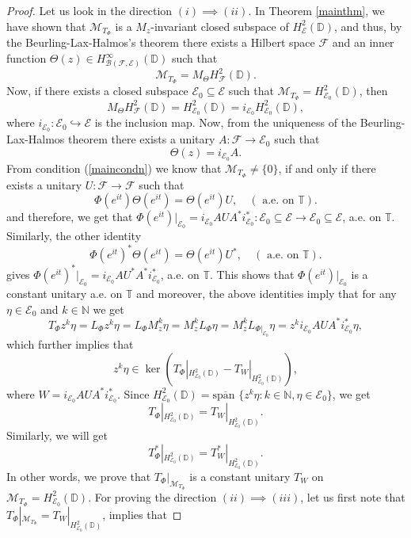 \documentclass[12pt]{amsart}
\numberwithin{equation}{section}
\theoremstyle{definition}
\newcommand{\Nat}{\mathbb{N}}
\newcommand{\D}{\mathbb{D}}
\newcommand{\T}{\mathbb{T}}
\newcommand{\1}{{\mbox{\bf 1}}}
\newcommand{\clb}{\mathcal{B}}
\newcommand{\cle}{\mathcal{E}}
\newcommand{\clf}{\mathcal{F}}
\newcommand{\clm}{\mathcal{M}}
\newcommand{\raro}{\rightarrow}
\begin{document}
\begin{proof}
Let us look in the direction $(i) \implies (ii)$. In Theorem \ref{mainthm}, we have shown that $\clm_{T_{\Phi}}$ is a $M_z$-invariant closed subspace of $H_{\cle}^2(\D)$, and thus, by the Beurling-Lax-Halmos's theorem there exists a Hilbert space $\clf$ and an inner function $\Theta(z) \in H_{\clb(\clf, \cle)}^{\infty}(\D)$ such that 
\[
\clm_{T_{\Phi}} = M_{\Theta} H_{\clf}^2(\D).
\]
Now,  if there exists a closed subspace $\cle_0 \subseteq \cle$ such that $\clm_{T_{\Phi}}  = H_{\cle_0}^2(\D)$, then
\[
M_{\Theta} H_{\clf}^2(\D) = H_{\cle_0}^2(\D) = i_{\cle_0} H_{\cle_0}^2(\D),
\]
where $i_{\cle_0} : \cle_0 \hookrightarrow \cle$ is the inclusion map.  Now, from the uniqueness of the Beurling-Lax-Halmos theorem there exists a unitary $A: \clf \raro \cle_0$ such that 
\[
\Theta(z) = i_{\cle_0} A.
\]
From condition (\ref{maincondn}) we know that $\clm_{T_{\Phi}} \neq \{0\}$, if and only if there exists a unitary $U: \clf \raro \clf$ such that
\[
\Phi(e^{it}) \Theta(e^{it}) =  \Theta(e^{it}) U, \quad (\text{ a.e. on } \T).
\]
and therefore, we get that $\Phi(e^{it})|_{\cle_0} = i_{\cle_0} A U A^* i_{\cle_0}^*: \cle_0 \subseteq \cle \raro \cle_0 \subseteq \cle $, a.e. on $\T$. Similarly, the other identity
\[
\Phi(e^{it})^* \Theta(e^{it}) =  \Theta(e^{it}) U^*, \quad (\text{ a.e. on } \T).
\]
gives $\Phi(e^{it})^*|_{\cle_0} = i_{\cle_0} A U^* A^* i_{\cle_0}^*$, a.e. on $\T$. This shows that $\Phi(e^{it})|_{\cle_0}$ is a constant unitary a.e. on $\T$ and moreover,  the above identities imply that for any $\eta \in \cle_0$ and $k \in \Nat$ we get
\[
T_{\Phi}z^k \eta  = L_{\Phi} z^k \eta = L_{\Phi}M_z^k  \eta = M_z^k L_{\Phi} \eta = M_z^k L_{\Phi|_{\cle_0}} \eta = z^k i_{\cle_0} A U A^* i_{\cle_0}^* \eta,
\]
which further implies that 
\[
z^k \eta \in \ker (T_{\Phi}|_{H_{\cle_0}^2(\D)} -  T_W|_{H_{\cle_0}^2(\D)}),
\]
where $W = i_{\cle_0} A U A^* i_{\cle_0}^*$. Since $H_{\cle_0}^2(\D) = \overline{\mbox{span }}\{z^k \eta: k \in \Nat, \eta \in \cle_0\}$, we get
\[
T_{\Phi}|_{H_{\cle_0}^2(\D)}  = T_W|_{H_{\cle_0}^2(\D)}.
\]
Similarly, we will get 
\[
T_{\Phi}^*|_{H_{\cle_0}^2(\D)}  =  T_W^*|_{H_{\cle_0}^2(\D)}.
\]
In other words,  we prove that $T_{\Phi}|_{\clm_{T_{\Phi}}}$ is a constant unitary $T_W$ on $\clm_{T_{\Phi}} = H_{\cle_0}^2(\D)$.
For proving the direction $(ii) \implies (iii)$,  let us first note that $T_{\Phi}|_{\clm_{T_{\Phi}}} = T_W |_{H_{\cle_0}^2(\D)}$, implies that

\end{proof}
\end{document}

